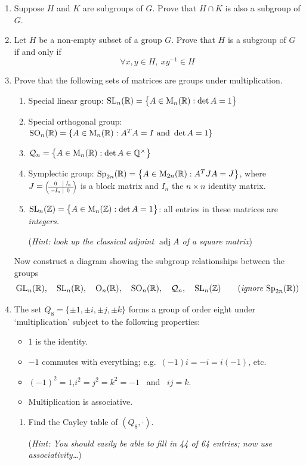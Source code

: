 \begin{exercises}
\begin{enumerate}
	\item Suppose $H$ and $K$ are subgroups of $G$. Prove that $H\cap K$ is also a subgroup of $G$.
   
	\item Let $H$ be a non-empty subset of a group $G$. Prove that $H$ is a subgroup of $G$ if and only if
  \[\forall x,y\in H,\ xy^{-1}\in H\]
  
  
  \item\label{exs:subgpmatrix} Prove that the following sets of matrices are groups under multiplication.
  \begin{enumerate}
    \item Special linear group: $\mathrm{SL}_n(\mathbb{R})=\bigl\{A\in \mathrm{M}_n(\mathbb{R}):\det A=1\bigr\}$
    \item Special orthogonal group: $\mathrm{SO}_n(\mathbb{R})=\{A\in\mathrm{M}_n(\mathbb{R}):A^TA=I\text{ and }\det A=1\}$
    \item $\mathcal Q_n=\bigl\{A\in \mathrm{M}_n(\mathbb{R}):\det A\in\mathbb{Q}^\times\bigr\}$
    \item Symplectic group: $\mathrm{Sp}_{2n}(\mathbb{R})=\bigl\{A\in \mathrm{M}_{2n}(\mathbb{R}):A^TJA=J\bigr\}$, where $J=\scalebox{0.65}{$\left(\!\begin{array}{c|c}
    0&I_n\\\hline -I_n&0
    \end{array}\!\right)$}$ is a block matrix and $I_n$ the $n\times n$ identity matrix.
    \item $\mathrm{SL}_n(\mathbb{Z})=\bigl\{A\in \mathrm{M}_n(\mathbb{Z}):\det A=1\bigr\}$: all entries in these matrices are \emph{integers.}\par
    (\emph{Hint: look up the classical adjoint $\operatorname{adj}A$ of a square matrix})
  \end{enumerate}
  Now construct a diagram showing the subgroup relationships between the groups
  \[\rGL_n(\R),\quad \rSL_n(\R),\quad \rO_n(\R),\quad \rSO_n(\R),\quad \mathcal Q_n,\quad \rSL_n(\Z)\tag{\emph{ignore $\rSp_{2n}(\R)$}}\]
 	
 	\item\label{exs:quaternion} The set $Q_8=\{\pm 1,\pm i,\pm j,\pm k\}$ forms a group of order eight under `multiplication' subject to the following properties:
  \begin{itemize}\itemsep0pt
    \item 1 is the identity.
    \item $-1$ commutes with everything; e.g.\ $(-1)i=-i=i(-1)$, etc.
    \item $(-1)^2=1$,\quad $i^2=j^2=k^2=-1$ \ and \ $ij=k$.
    \item Multiplication is associative.
  \end{itemize}
  \begin{enumerate}
    \item Find the Cayley table of $(Q_8,\cdot)$.\par
  	(\emph{Hint: You should easily be able to fill in 44 of 64 entries; now use associativity\ldots})
  

\end{enumerate}
\end{enumerate}
\end{exercises}
